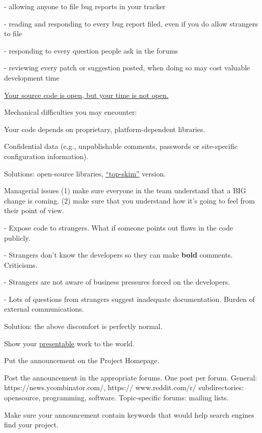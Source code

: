 \documentclass[landscape,30pt]{foils}
\begin{document}
- allowing anyone to file bug reports in your tracker

- reading and responding to every bug report filed, even if you do allow strangers to file

- responding to every question people ask in the forums

- reviewing every patch or suggestion posted, when doing so may cost valuable development time

\underline{Your source code is open, but your time is not open.}


Mechanical difficulties you may encounter:

Your code depends on proprietary, platform-dependent libraries. 

Confidential data (e.g., unpublishable comments, passwords or
site-specific configuration information).

Solutions: open-source libraries, \underline{``top-skim''} version.

Managerial issues (1) make sure everyone in the team understand that a BIG change is coming. (2) make sure that you understand how it's going to feel from their point of view.

- Expose code to strangers.  What if someone points out flaws in the code publicly.

- Strangers don't know the developers so they can make {\bf bold} comments. Criticisms.

- Strangers are not aware of business pressures forced on the developers.

- Lots of questions from strangers suggest inadequate documentation.  Burden of external communications.

Solution: the above discomfort is perfectly normal.


Show your \underline{presentable} work to the world.

Put the announcement on the Project Homepage.

Post the announcement in the appropriate forums.   One post per forum.  General: https://news.ycombinator.com/, https://
www.reddit.com/r/ subdirectories: opensource, programming, software.  Topic-specific forums: mailing lists. 

Make sure your announcement contain keywords that would help search engines find your project.
\end{document}
